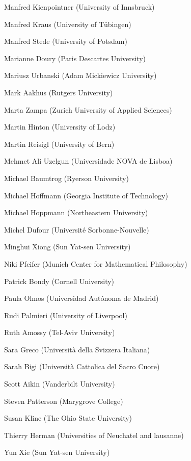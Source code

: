 \begin{compactitem}[]
		\item[] Manfred Kienpointner (University of Innsbruck)
		\item[] Manfred Kraus (University of Tübingen)
		\item[] Manfred Stede (University of Potsdam)
		\item[] Marianne Doury (Paris Descartes University)
		\item[] Mariusz Urbanski (Adam Mickiewicz University)
		\item[] Mark Aakhus (Rutgers University)
		\item[] Marta Zampa (Zurich University of Applied Sciences)
		\item[] Martin Hinton (University of Lodz)
		\item[] Martin Reisigl (University of Bern)
		\item[] Mehmet Ali Uzelgun (Universidade NOVA de Lisboa)
		\item[] Michael Baumtrog (Ryerson University)
		\item[] Michael Hoffmann (Georgia Institute of Technology)
		\item[] Michael Hoppmann (Northeastern University)
		\item[] Michel Dufour (Université Sorbonne-Nouvelle)
		\item[] Minghui Xiong (Sun Yat-sen University)
		\item[] Niki Pfeifer (Munich Center for Mathematical Philosophy)
		\item[] Patrick Bondy (Cornell University)
		\item[] Paula Olmos (Universidad Autónoma de Madrid)
		\item[] Rudi Palmieri (University of Liverpool)
		\item[] Ruth Amossy (Tel-Aviv University)
		\item[] Sara Greco (Università della Svizzera Italiana)
		\item[] Sarah Bigi (Università Cattolica del Sacro Cuore)
		\item[] Scott Aikin (Vanderbilt University)
		\item[] Steven Patterson (Marygrove College)
		\item[] Susan Kline (The Ohio State University)
		\item[] Thierry Herman (Universities of Neuchatel and lausanne)
		\item[] Yun Xie (Sun Yat-sen University)
	\end{compactitem}

\newpage

